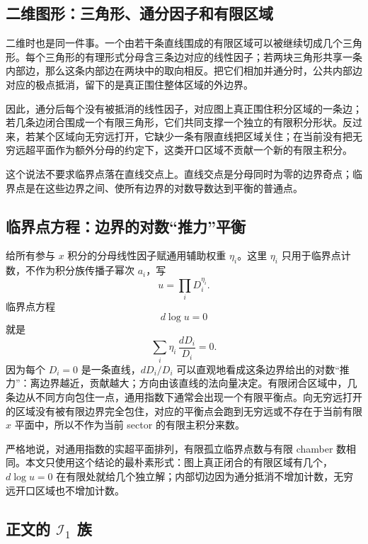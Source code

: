 ﻿\documentclass[a4paper,11pt]{article}
\begin{document}
\subsection{二维图形：三角形、通分因子和有限区域}

二维时也是同一件事。一个由若干条直线围成的有限区域可以被继续切成几个三角形。每个三角形的有理形式分母含三条边对应的线性因子；若两块三角形共享一条内部边，那么这条内部边在两块中的取向相反。把它们相加并通分时，公共内部边对应的极点抵消，留下的是真正围住整体区域的外边界。

因此，通分后每个没有被抵消的线性因子，对应图上真正围住积分区域的一条边；若几条边闭合围成一个有限三角形，它们共同支撑一个独立的有限积分形状。反过来，若某个区域向无穷远打开，它缺少一条有限直线把区域关住；在当前没有把无穷远超平面作为额外分母的约定下，这类开口区域不贡献一个新的有限主积分。

这个说法不要求临界点落在直线交点上。直线交点是分母同时为零的边界奇点；临界点是在这些边界之间、使所有边界的对数导数达到平衡的普通点。

\subsection{临界点方程：边界的对数“推力”平衡}

给所有参与 $x$ 积分的分母线性因子赋通用辅助权重 $\eta_i$。这里 $\eta_i$ 只用于临界点计数，不作为积分族传播子幂次 $a_i$，写
\begin{equation}
    u=\prod_i D_i^{\eta_i}.
\end{equation}
临界点方程
\begin{equation}
    d\log u=0
\end{equation}
就是
\begin{equation}
    \sum_i\eta_i\,\frac{dD_i}{D_i}=0.
\end{equation}
因为每个 $D_i=0$ 是一条直线，$dD_i/D_i$ 可以直观地看成这条边界给出的对数“推力”：离边界越近，贡献越大；方向由该直线的法向量决定。有限闭合区域中，几条边从不同方向包住一点，通用指数下通常会出现一个有限平衡点。向无穷远打开的区域没有被有限边界完全包住，对应的平衡点会跑到无穷远或不存在于当前有限 $x$ 平面中，所以不作为当前 sector 的有限主积分来数。

严格地说，对通用指数的实超平面排列，有限孤立临界点数与有限 chamber 数相同。本文只使用这个结论的最朴素形式：图上真正闭合的有限区域有几个，$d\log u=0$ 在有限处就给几个独立解；内部切边因为通分抵消不增加计数，无穷远开口区域也不增加计数。

\subsection{正文的 $\mathcal{I}_1$ 族}
\end{document}
